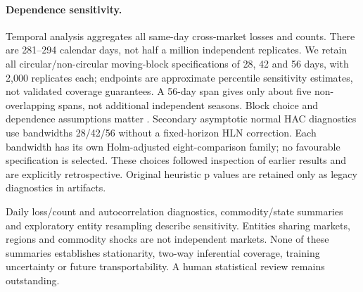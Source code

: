 \paragraph{Dependence sensitivity.} Temporal analysis aggregates all same-day cross-market losses and counts. There are 281--294 calendar days, not half a million independent replicates. We retain all circular/non-circular moving-block specifications of 28, 42 and 56 days, with 2,000 replicates each; endpoints are approximate percentile sensitivity estimates, not validated coverage guarantees. A 56-day span gives only about five non-overlapping spans, not additional independent seasons. Block choice and dependence assumptions matter \cite{politis2004block}. Secondary asymptotic normal HAC diagnostics use bandwidths 28/42/56 without a fixed-horizon HLN correction. Each bandwidth has its own Holm-adjusted eight-comparison family; no favourable specification is selected. These choices followed inspection of earlier results and are explicitly retrospective. Original heuristic p values are retained only as legacy diagnostics in artifacts.

Daily loss/count and autocorrelation diagnostics, commodity/state summaries and exploratory entity resampling describe sensitivity. Entities sharing markets, regions and commodity shocks are not independent markets. None of these summaries establishes stationarity, two-way inferential coverage, training uncertainty or future transportability. A human statistical review remains outstanding.
